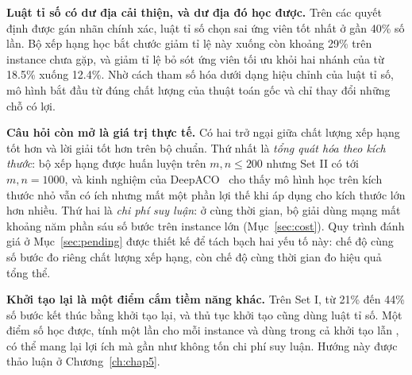 \textbf{Luật tỉ số có dư địa cải thiện, và dư địa đó học được.} Trên các quyết định được gán nhãn chính xác, luật tỉ số chọn sai ứng viên tốt nhất ở gần 40\% số lần. Bộ xếp hạng học bắt chước giảm tỉ lệ này xuống còn khoảng 29\% trên instance chưa gặp, và giảm tỉ lệ bỏ sót ứng viên tối ưu khỏi hai nhánh của \addstar từ 18.5\% xuống 12.4\%. Nhờ cách tham số hóa dưới dạng hiệu chỉnh của luật tỉ số, mô hình bắt đầu từ đúng chất lượng của thuật toán gốc và chỉ thay đổi những chỗ có lợi.

\textbf{Câu hỏi còn mở là giá trị thực tế.} Có hai trở ngại giữa chất lượng xếp hạng tốt hơn và lời giải tốt hơn trên bộ chuẩn. Thứ nhất là \emph{tổng quát hóa theo kích thước}: bộ xếp hạng được huấn luyện trên $m,n\le200$ nhưng Set II có tới $m,n=1000$, và kinh nghiệm của DeepACO~\cite{Ye2023DeepACO} cho thấy mô hình học trên kích thước nhỏ vẫn có ích nhưng mất một phần lợi thế khi áp dụng cho kích thước lớn hơn nhiều. Thứ hai là \emph{chi phí suy luận}: ở cùng thời gian, bộ giải dùng mạng mất khoảng năm phần sáu số bước trên instance lớn (Mục~\ref{sec:cost}). Quy trình đánh giá ở Mục~\ref{sec:pending} được thiết kế để tách bạch hai yếu tố này: chế độ cùng số bước đo riêng chất lượng xếp hạng, còn chế độ cùng thời gian đo hiệu quả tổng thể.

\textbf{Khởi tạo lại là một điểm cắm tiềm năng khác.} Trên Set I, từ 21\% đến 44\% số bước kết thúc bằng khởi tạo lại, và thủ tục khởi tạo cũng dùng luật tỉ số. Một điểm số học được, tính một lần cho mỗi instance và dùng trong cả khởi tạo lẫn \addstar, có thể mang lại lợi ích mà gần như không tốn chi phí suy luận. Hướng này được thảo luận ở Chương~\ref{ch:chap5}.
